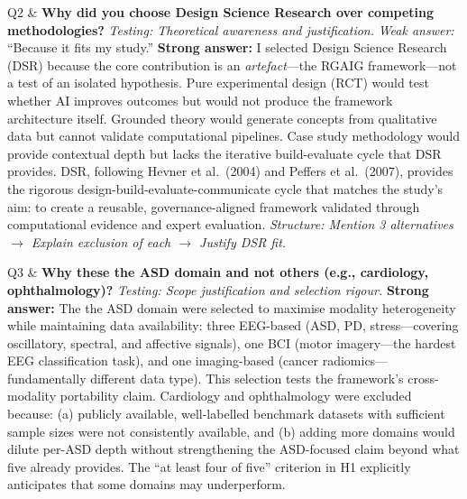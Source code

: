 \begin{xltabular}
Q2 & \textbf{Why did you choose Design Science Research over competing methodologies?} \newline
\textit{Testing: Theoretical awareness and justification.} \newline\newline
\textit{Weak answer:} ``Because it fits my study.'' \newline\newline
\textbf{Strong answer:} I selected Design Science Research (DSR) because the core contribution is an \textit{artefact}---the RGAIG framework---not a test of an isolated hypothesis. Pure experimental design (RCT) would test whether AI improves outcomes but would not produce the framework architecture itself. Grounded theory would generate concepts from qualitative data but cannot validate computational pipelines. Case study methodology would provide contextual depth but lacks the iterative build-evaluate cycle that DSR provides. DSR, following Hevner et al.\ (2004) and Peffers et al.\ (2007), provides the rigorous design-build-evaluate-communicate cycle that matches the study's aim: to create a reusable, governance-aligned framework validated through computational evidence and expert evaluation. \newline\newline
\textit{Structure: Mention 3 alternatives $\rightarrow$ Explain exclusion of each $\rightarrow$ Justify DSR fit.} \\
\addlinespace

Q3 & \textbf{Why these the ASD domain and not others (e.g., cardiology, ophthalmology)?} \newline
\textit{Testing: Scope justification and selection rigour.} \newline\newline
\textbf{Strong answer:} The the ASD domain were selected to maximise modality heterogeneity while maintaining data availability: three EEG-based (ASD, PD, stress---covering oscillatory, spectral, and affective signals), one BCI (motor imagery---the hardest EEG classification task), and one imaging-based (cancer radiomics---fundamentally different data type). This selection tests the framework's cross-modality portability claim. Cardiology and ophthalmology were excluded because: (a) publicly available, well-labelled benchmark datasets with sufficient sample sizes were not consistently available, and (b) adding more domains would dilute per-ASD depth without strengthening the ASD-focused claim beyond what five already provides. The ``at least four of five'' criterion in H1 explicitly anticipates that some domains may underperform. \\
\addlinespace


\end{xltabular}
